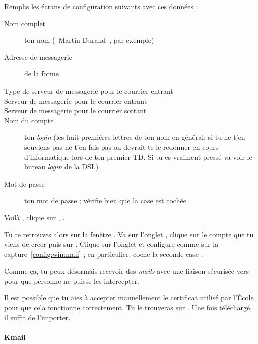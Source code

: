 Remplis les \'ecrans de configuration suivants avec ces donn\'ees :
\begin{description}
  \item[Nom complet] ton nom (\guillemotleft~Martin Durand~\guillemotright , par exemple)
  \item[Adresse de messagerie] de la forme 
  \item[Type de serveur de messagerie pour le courrier entrant] 
  \item[Serveur de messagerie pour le courrier entrant] 
  \item[Serveur de messagerie pour le courrier sortant] 
  \item[Nom du compte] ton \emph{login}  (les huit premi\`eres lettres de ton nom en g\'en\'eral; si tu ne t'en souviens pas ne t'en fais pas on devrait te le redonner en cours d'informatique lors de ton premier TD. Si tu es vraiment press\'e va voir le bureau \emph{login} de la DSI.)
  \item[Mot de passe] ton mot de passe  ;
       v\'erifie bien que la case  est coch\'ee.
\end{description}

Voil\`a , clique sur , .

Tu te retrouves alors sur la fen\^etre . Va sur
l'onglet , clique sur le compte que tu viens de cr\'eer
puis sur . Clique sur l'onglet  et
configure comme sur la capture~\ref{config:win:mail} ; en
particulier, coche la seconde case .

Comme \c{c}a, tu peux d\'esormais recevoir des \emph{mails} avec une liaison
s\'ecuris\'ee vers  pour que personne ne puisse les
intercepter.

Il est possible que tu aies à accepter manuellement le certificat utilisé par l'\'Ecole pour que cela fonctionne correctement. Tu le trouveras sur . Une fois téléchargé, il suffit de l'importer.




\paragraph{Kmail}

